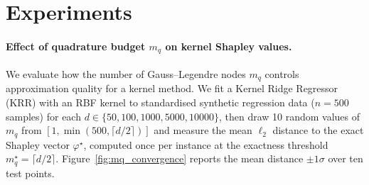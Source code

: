 \documentclass{article}
\newcommand{\cS}{\mathcal{S}}
\begin{document}



\section{Experiments}

\paragraph{Effect of quadrature budget $m_q$ on kernel Shapley values.}
We evaluate how the number of Gauss--Legendre nodes $m_q$ controls
approximation quality for a kernel method.
We fit a Kernel Ridge Regressor (KRR) with an RBF kernel to
standardised synthetic regression data ($n{=}500$ samples) for each
$d \in \{50, 100, 1000, 5000, 10000\}$, then draw 10 random values of
$m_q$ from $[1, \min(500,\lceil d/2\rceil)]$ and measure the mean
$\ell_2$ distance to the exact Shapley vector $\varphi^\star$, computed
once per instance at the exactness threshold $m_q^\star{=}\lceil d/2\rceil$.
Figure~\ref{fig:mq_convergence} reports the mean distance $\pm1\sigma$
over ten test points.
\end{document}
